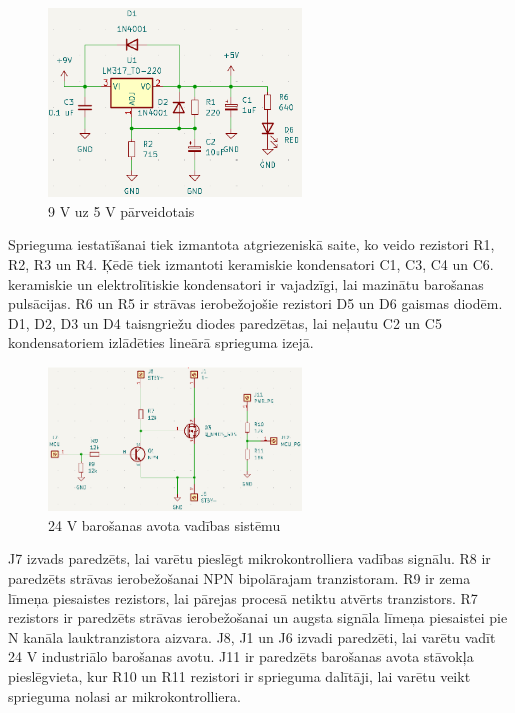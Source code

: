 \begin{figure}[H]
	\centering
    \includegraphics[width=0.6\textwidth]{pictures/5v.png}\hspace{1cm}
    \caption{9 V uz 5 V pārveidotais}
\end{figure}
Sprieguma iestatīšanai tiek izmantota atgriezeniskā saite, ko veido rezistori R1, R2, R3 un R4. Ķēdē tiek izmantoti keramiskie kondensatori C1, C3, C4 un C6. keramiskie un elektrolītiskie kondensatori ir vajadzīgi, lai mazinātu barošanas pulsācijas. R6 un R5 ir strāvas ierobežojošie rezistori D5 un D6 gaismas diodēm. D1, D2, D3 un D4 taisngriežu diodes paredzētas, lai neļautu C2 un C5 kondensatoriem izlādēties lineārā sprieguma izejā.
\begin{figure}[H]
	\centering
    \includegraphics[width=0.6\textwidth]{pictures/24_control_detection.png}\hspace{1cm}
    \caption{24 V barošanas avota vadības sistēmu}
\end{figure}
J7 izvads paredzēts, lai varētu pieslēgt mikrokontrolliera vadības signālu. R8 ir paredzēts strāvas ierobežošanai NPN bipolārajam tranzistoram. R9 ir zema līmeņa piesaistes rezistors, lai pārejas procesā netiktu atvērts tranzistors. R7 rezistors ir paredzēts strāvas ierobežošanai un augsta signāla līmeņa piesaistei pie N kanāla lauktranzistora aizvara. J8, J1 un J6 izvadi paredzēti, lai varētu vadīt 24 V industriālo barošanas avotu. J11 ir paredzēts barošanas avota stāvokļa pieslēgvieta, kur R10 un R11 rezistori ir sprieguma dalītāji, lai varētu veikt sprieguma nolasi ar mikrokontrolliera.
